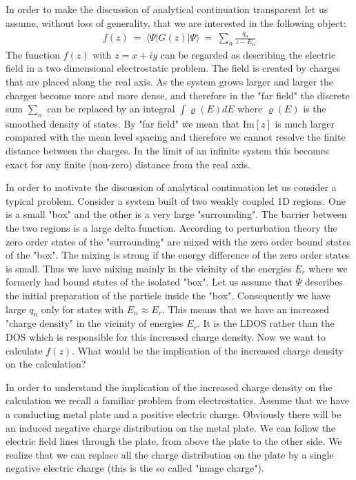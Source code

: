 \documentclass[onecolumn,fleqn]{revtex4}
\newcommand{\im}{\mathrm{Im}}
\newcommand{\gdos}{\varrho} \newcommand{\EPS}{\mathcal{E}}
\newcommand{\beq}{\begin{eqnarray}}
\newcommand{\eeq}{\end{eqnarray}}
\begin{document}
In order to make the discussion of analytical continuation  
transparent let us assume, without loss of generality,    
that we are interested in the following object: 
\beq
f(z) \ = \  \langle \Psi |G(z)| \Psi \rangle 
\ = \ \sum_n \frac{q_n}{z-E_n} 
\eeq
The function $f(z)$ with $z=x+iy$ can be regarded 
as describing the electric field in a two dimensional  
electrostatic problem. The field is created by charges 
that are placed along the real axis.
As the system grows larger and larger the charges become 
more and more dense, and therefore in the "far field" 
the discrete sum $\sum_n$ can be replaced 
by an integral $\int \gdos(E)dE$ where $\gdos(E)$ 
is the smoothed density of states.  
By "far field" we mean that $\im[z]$ is much larger  
compared with the mean level spacing and therefore 
we cannot resolve the finite distance between the charges. 
In the limit of an infinite system this becomes exact for 
any finite (non-zero) distance from the real axis.


In order to motivate the discussion of analytical 
continuation let us consider a typical problem.
Consider a system built of two weakly coupled 1D regions. 
One is a small "box" and the other is a very large "surrounding". 
The barrier between the two regions is a large delta function.  
According to perturbation theory the zero order states 
of the "surrounding" are mixed with the zero order bound 
states of the "box". The mixing is strong if the energy 
difference of the zero order states is small. 
Thus we have mixing mainly in the vicinity 
of the energies $E_r$ where we formerly 
had bound states of the isolated "box". 
Let us assume that $\Psi$ describes the initial 
preparation of the particle inside the "box". 
Consequently we have large $q_n$ only for 
states with $E_n \approx E_r$.  
This means that we have an increased "charge density"  
in the vicinity of energies $E_r$. It is the LDOS rather 
than the DOS which is responsible for this increased 
charge density. Now we want to calculate $f(z)$. 
What would be the implication of the increased 
charge density on the calculation?


In order to understand the implication of the increased 
charge density on the calculation we recall a familiar 
problem from electrostatics. Assume that we have a conducting 
metal plate and a positive electric charge. Obviously there will 
be an induced negative charge distribution on the metal plate. 
We can follow the electric field lines through the plate, from above
the plate to the other side. We realize that we can replace all the
charge distribution on the plate by a single negative electric charge (this
is the so called "image charge").
\end{document}
